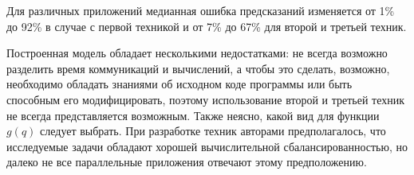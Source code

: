 
		Для различных приложений медианная ошибка предсказаний изменяется от 1\% до 92\% в случае с первой техникой и от 7\% до 67\% для второй и третьей техник.

		Построенная модель обладает несколькими недостатками: не всегда возможно разделить время коммуникаций и вычислений, а чтобы это сделать, возможно, необходимо обладать знаниями об исходном коде программы или быть способным его модифицировать, поэтому использование второй и третьей техник не всегда представляется возможным. Также неясно, какой вид для функции \(g(q)\) следует выбрать. При разработке техник авторами предполагалось, что исследуемые задачи обладают хорошей вычислительной сбалансированностью, но далеко не все параллельные приложения отвечают этому предположению.

